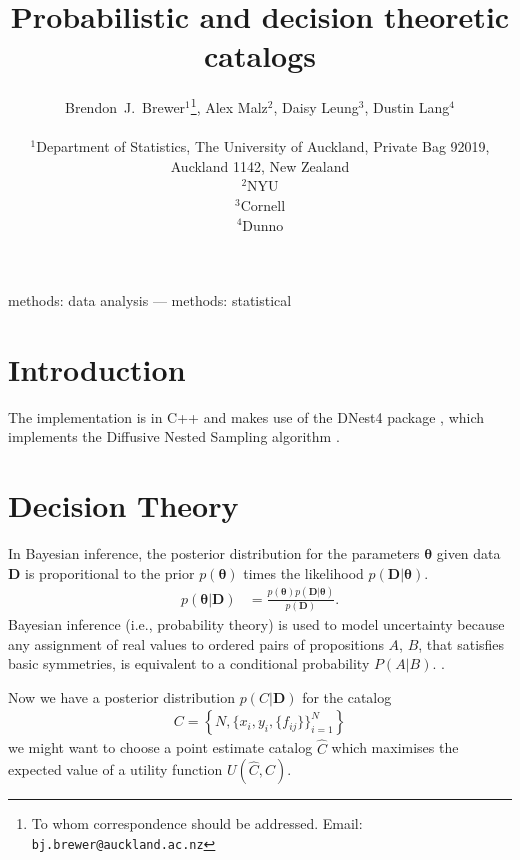 \documentclass[a4paper,fleqn,usenatbib]{mnras}
\title[]
{Probabilistic and decision theoretic catalogs}
\author[Brewer, Malz, Leung, and Lang]{%
  Brendon~J.~Brewer$^{1}$\thanks{To whom correspondence should be addressed. Email: {\tt bj.brewer@auckland.ac.nz}}, Alex Malz$^2$, Daisy Leung$^3$, Dustin Lang$^4$\\
  \medskip\\
  $^1$Department of Statistics, The University of Auckland, Private Bag 92019,
        Auckland 1142, New Zealand\\
  $^2$NYU\\
  $^3$Cornell\\
  $^4$Dunno}
\date{}
\newcommand{\params}{\boldsymbol{\theta}}
\newcommand{\data}{\boldsymbol{D}}
\begin{document}
\label{firstpage}
\pagerange{\pageref{firstpage}--\pageref{lastpage}}
\maketitle

\begin{abstract}
\end{abstract}

\begin{keywords}
methods: data analysis --- methods: statistical
\end{keywords}



\section{Introduction}


The implementation is in C++ and makes use of the DNest4 package \citep{dnest4},
which implements the Diffusive Nested Sampling algorithm \citep{dns}.

\section{Decision Theory}
In Bayesian inference, the posterior distribution for the parameters
$\params$ given data $\data$ is proporitional to the prior $p(\params)$
times the likelihood $p(\data | \params)$.
\begin{align}
p(\params | \data) &= \frac{p(\params)p(\data | \params)}{p(\data)}.
\end{align}
Bayesian inference (i.e., probability theory) is used to model uncertainty
because any assignment of real values to
ordered pairs of propositions $A$, $B$, that satisfies basic
symmetries, is equivalent to a conditional probability $P(A | B)$.
\citep{knuth2012foundations}.


Now we have a posterior distribution $p(C|\data)$ for the catalog
\begin{eqnarray}
C = \left\{N,\{x_i, y_i, \{f_{ij}\}\}_{i=1}^N \right\}
\end{eqnarray}
we might want to choose a point estimate catalog $\hat{C}$ which
maximises the expected value of a utility function $U(\hat{C}, C)$.\\
\end{document}

